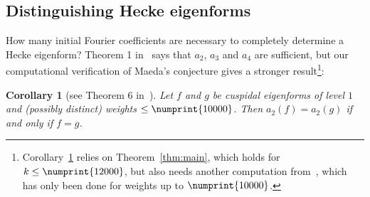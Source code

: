 \documentclass[11pt]{article}
\theoremstyle{plain}
\newtheorem{corollary}[theorem]{Corollary}
\theoremstyle{definition}
\theoremstyle{remark}
\numberwithin{equation}{section}
\newcommand{\bound}{\numprint{12000}}
\begin{document}
\subsection{Distinguishing Hecke eigenforms}

How many initial Fourier coefficients are necessary to completely determine a
Hecke eigenform?  Theorem 1 in~\cite{Ghitza} says that $a_2$, $a_3$ and $a_4$
are sufficient, but our computational verification of Maeda's conjecture gives
a stronger result\footnote{Corollary~\ref{cor:distinguish} relies on
Theorem~\ref{thm:main}, which holds for $k\leq\bound$, but also needs another
computation from~\cite{Ghitza}, which has only been done for weights up to
$\numprint{10000}$.}:

\begin{corollary}[see Theorem 6 in~\cite{Ghitza}]
  \label{cor:distinguish}
  Let $f$ and $g$ be cuspidal eigenforms of level $1$ and (possibly distinct)
  weights
  $\leq\numprint{10000}$.  Then $a_2(f)=a_2(g)$ if and only if $f=g$.
\end{corollary}



\printbibliography
\end{document}

